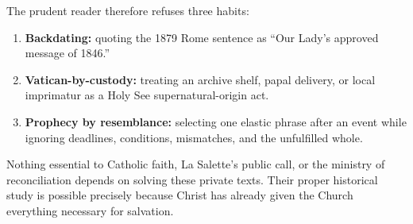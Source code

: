 The prudent reader therefore refuses three habits:

\begin{enumerate}
  \item \textbf{Backdating:} quoting the 1879 Rome sentence as ``Our Lady's approved message of 1846.''
  \item \textbf{Vatican-by-custody:} treating an archive shelf, papal delivery, or local imprimatur as a Holy See supernatural-origin act.
  \item \textbf{Prophecy by resemblance:} selecting one elastic phrase after an event while ignoring deadlines, conditions, mismatches, and the unfulfilled whole.
\end{enumerate}

Nothing essential to Catholic faith, La Salette's public call, or the ministry of reconciliation depends on solving these private texts. Their proper historical study is possible precisely because Christ has already given the Church everything necessary for salvation.
